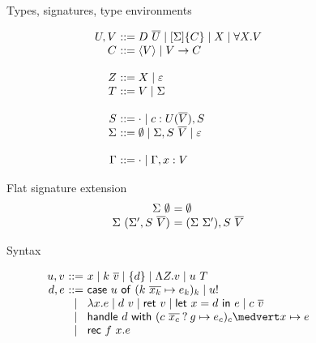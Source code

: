 \documentclass[preprint]{sigplanconf}
\makeatletter
\newcommand{\set}[1]{\{#1\}}
\newcommand{\many}{\overline}
\newcommand{\seml}{\left\llbracket}
\newcommand{\semr}{\right\rrbracket}
\newcommand{\FV}{\mathit{FV}}
\newcommand{\dom}{\mathit{dom}}
\newcommand\ba{\begin{array}}
\newcommand\ea{\end{array}}
\newcommand{\bl}{\ba{@{}c@{}}}
\newcommand{\el}{\ea}
\newcommand{\val}[3]  {#1 \vdash {#2} : {#3}}
\newcommand{\rt}[1]{\langle{#1}\rangle}   %
\newcommand{\sig}{S}
\newcommand{\sigs}{\Sigma}
\newcommand{\effbox}[1]{[#1]}
\newcommand{\key}[1]{\mathsf{#1}}
\newcommand{\handleSymbol}{\mathbin{?}}
\newcommand{\handle}[2]{{#1} \handleSymbol {#2}}
\newcommand{\thunk}[1]{\{{#1}\}}
\newcommand{\force}[1]{{#1}!}
\makeatother
\begin{document}

\begin{figure*}

Types, signatures, type environments

\[
\begin{array}{@{}r@{~}l@{}}
U, V &::= D~\many{U} \mid \effbox{\sigs}\thunk{C} \mid X \mid \forall X.V \\
C    &::= \rt{V} \mid V \to C \\  %
\\
Z    &::= X \mid \varepsilon \\
T    &::= V \mid \sigs \\
\\
\sig  &::= \cdot \mid c : U(\many{V}), \sig \\
\sigs &::=
  \emptyset \mid \sigs, \sig~\many{V} \mid \varepsilon \\
\\
\Gamma &::= \cdot \mid \Gamma, x:V \\
\end{array}
\]

Flat signature extension
\[
\begin{array}{@{}r@{~}l@{}}
\sigs~\emptyset &= \emptyset \\
\sigs~(\sigs', \sig~\many{V}) &= (\sigs~\sigs'), \sig~\many{V} \\
\end{array}
\]

Syntax

\[
\begin{array}{@{}r@{~}c@{~}l@{}}
u, v &::=& x \mid k~\many{v} \mid \thunk{d}
             \mid \Lambda Z.v \mid u~T \\
d, e &::=& \key{case}~u~\key{of}~
             (k~\many{x_k} \mapsto e_k)_k
     \mid \force{u} \\
     &\mid& \lambda x.e \mid d~v 
      \mid \key{ret}~v \mid \key{let}~x=d~\key{in}~e
      \mid c~\many{v} \\
     &\mid& \key{handle} ~d~ \key{with}~
               (\handle{c~\many{x_c}}{g} \mapsto e_c)_c \medvert
               x        \mapsto e \\
     &\mid& \key{rec}~f~x.e \\
\end{array}
\]


\end{figure*}
\end{document}
